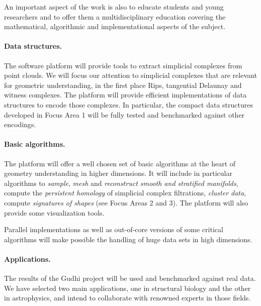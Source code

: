 An important aspect of the work is also to educate students and young
researchers and to offer them a multidisciplinary education covering
the mathematical, algorithmic and implementational aspects of the subject.


\paragraph{Data structures.}
The software platform will provide tools to extract simplicial
complexes from point clouds. We will focus our attention to simplicial
complexes that are relevant for geometric understanding, in the first
place Rips,
tangential Delaunay and witness complexes.  The platform will provide
efficient implementations of data structures to encode those
complexes. In particular, the compact data structures developed in
Focus Area 1 will be fully tested and benchmarked against other
encodings.

\paragraph{Basic algorithms.}
The platform will offer a well chosen set of basic algorithms at the
heart of geometry understanding in higher dimensions. It will include
in particular algorithms to {\em sample}, {\em mesh} and {\em
reconstruct smooth and stratified manifolds}, compute the {\em persistent homology} of
simplicial complex filtrations, {\em cluster data}, compute {\em
signatures of shapes} (see Focus Areas 2 and 3). The platform will
also provide some visualization tools.


Parallel implementations as well as out-of-core versions of some
critical algorithms %
will make possible the handling of huge data sets in high dimensions.

\paragraph{Applications.}
The results of the Gudhi project will be used and benchmarked against
real data. We have selected two main applications, one in structural
biology and the other in astrophysics, and intend to
collaborate with renowned experts in those fields. 


